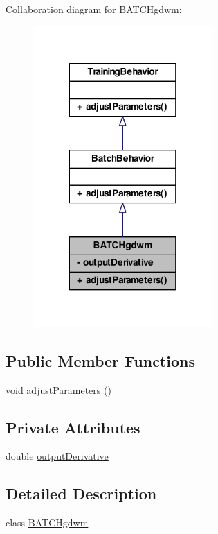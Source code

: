Collaboration diagram for BATCHgdwm:
\nopagebreak
\begin{figure}[H]
\begin{center}
\leavevmode
\includegraphics[width=194pt]{class_b_a_t_c_hgdwm__coll__graph}
\end{center}
\end{figure}
\subsection*{Public Member Functions}
\begin{DoxyCompactItemize}
\item 
void \hyperlink{class_b_a_t_c_hgdwm_af53c2c70dcef41328bb405f2905fd2c9}{adjustParameters} ()
\end{DoxyCompactItemize}
\subsection*{Private Attributes}
\begin{DoxyCompactItemize}
\item 
double \hyperlink{class_b_a_t_c_hgdwm_af22fdd2215a316dfe0739d377fcb87a8}{outputDerivative}
\end{DoxyCompactItemize}


\subsection{Detailed Description}
class \hyperlink{class_b_a_t_c_hgdwm}{BATCHgdwm} -\/ 

